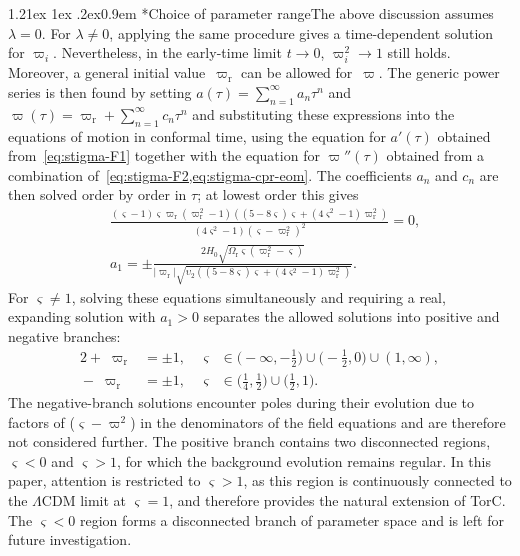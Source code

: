 \documentclass[aps,prd,reprint,preprintnumbers,showpacs,floatfix,nofootinbib,superscriptaddress]{revtex4-2}
\makeatletter
\renewcommand{\paragraph}{%
\@startsection{paragraph}{4}%
{\z@}{1.21ex \@plus 1ex \@minus .2ex}{0.9em}%
{\normalfont\normalsize\bfseries}%
}
\newcommand{\LCDM}{\ensuremath{\Lambda\mathrm{CDM}}}
\newcommand{\abs}[1]{\left\lvert #1 \right\rvert}
\newcommand{\cpr}{\varpi}
\newcommand{\cprr}{\varpi_\mathrm{r}}
\makeatother
\begin{document}
\paragraph*{Choice of parameter range}The above discussion assumes $\lambda=0$. For $\lambda\neq0$, applying the same procedure gives a time-dependent solution for $\cpr_i$. Nevertheless, in the early-time limit $t\to0$, $\cpr_i^2\to1$ still holds. Moreover, a general initial value~$\cprr$ can be allowed for~$\varpi$. The generic power series is then found by setting $a(\tau) = \sum_{n=1}^{\infty} a_n \tau^n$ and $\cpr(\tau) = \cprr + \sum_{n=1}^{\infty} c_n \tau^n$ and substituting these expressions into the equations of motion in conformal time, using the equation for $a'(\tau)$ obtained from~\cref{eq:stigma-F1} together with the equation for $\cpr''(\tau)$ obtained from a combination of~\cref{eq:stigma-F2,eq:stigma-cpr-eom}. The coefficients $a_n$ and $c_n$ are then solved order by order in $\tau$; at lowest order this gives
\begin{align}
		& \frac{(\varsigma -1) \varsigma \cprr (\cprr^2 - 1)((5 - 8 \varsigma)\varsigma + (4\varsigma^2 - 1)\cprr^2 )}{(4\varsigma^2- 1)(\varsigma - \cprr^2)^2} = 0, \\
		& a_1 = \pm \frac{2 H_0 \sqrt{\Omega_{\mathrm{r}}\varsigma(\cprr^2-\varsigma)}}{\abs{\cprr} \sqrt{\upsilon_2((5 - 8 \varsigma)\varsigma + (4\varsigma^2 - 1)\cprr^2 )}}. \label{eq:signofa1}
\end{align}
For $\varsigma\neq1$, solving these equations simultaneously and requiring a real, expanding solution with $a_1>0$ separates the allowed solutions into positive and negative branches:
\begin{alignat}{2}
		\boxed{+} \; \cprr &= \pm 1, \;\, & \varsigma &\in \bigl(-\infty,-\tfrac{1}{2}\bigr) \cup \bigl(-\tfrac{1}{2},0\bigr) \cup (1,\infty), \label{eq:posbranch}\\
\boxed{-} \; \cprr &= \pm 1, \;\, & \varsigma &\in \bigl(\tfrac{1}{4},\tfrac{1}{2}\bigr) \cup \bigl(\tfrac{1}{2},1\bigr). \label{eq:negbranch}
\end{alignat}
The negative-branch solutions encounter poles during their evolution due to factors of ($\varsigma-\varpi^2$) in the denominators of the field equations and are therefore not considered further. The positive branch contains two disconnected regions, $\varsigma<0$ and $\varsigma>1$, for which the background evolution remains regular. In this paper, attention is restricted to $\varsigma > 1$, as this region is continuously connected to the \LCDM{} limit at $\varsigma = 1$, and therefore provides the natural extension of TorC. The $\varsigma<0$ region forms a disconnected branch of parameter space and is left for future investigation.
\end{document}
